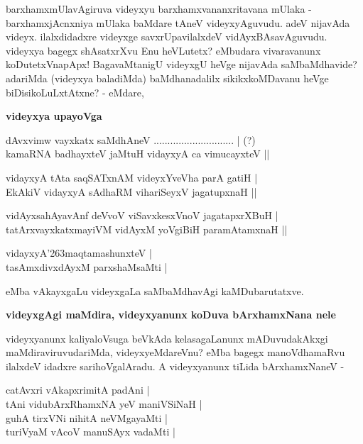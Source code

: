 \noindent
barxhamxmUlavAgiruva videyxyu barxhamxvananxritavana mUlaka - barxhamxjAcnxniya mUlaka baMdare tAneV videyx\-yAgu\-vudu. adeV nijavAda videyx. ilalxdidadxre videyxge savxrUpavilalxdeV vidAyxBAsavAguvudu. videyxya bagegx shAsatxrXvu Enu heVLutetx? eMbudara vivaravanunx koDutetxVnapApx! BagavaMtanigU videyxgU heVge nija\-vAda saMbaMdhavide? adariMda (videyxya baladiMda) baMdhanadalilx sikikxkoMDavanu heVge biDisi\-koLuLx\-tAtxne? - eMdare,

{\bigskip
\noindent
{\large\bf videyxya upayoVga}}

\begin{shloka}
dAvxvimw vayxkatx saMdhAneV ............................. | (?)\\\label{86}
kamaRNA badhayxteV jaMtuH vidayxyA ca vimucayxteV ||
\end{shloka}

\begin{shloka}
vidayxyA tAta saqSATxnAM videyxYveVha parA gatiH |\\\label{86}
EkAkiV vidayxyA sAdhaRM vihariSeyxV jagatupxnaH ||\\\label{86}

vidAyxsahAyavAnf deVvoV viSavxkesxVnoV jagatapxrXBuH |\\\label{86}
tatArxvayxkatxmayiVM vidAyxM yoVgiBiH paramAtamxnaH ||\\\label{86}

vidayxyA\char'263maqtamashunxteV |\\\label{86}
tasAmxdivxdAyxM parxshaMsaMti |\label{86}
\end{shloka}

\noindent
eMba vAkayxgaLu videyxgaLa saMbaMdhavAgi kaMDubarutatxve.

{\bigskip
\noindent
{\large\bf videyxgAgi maMdira, videyxyanunx koDuva bArxhamxNana nele}}
\medskip

\noindent
videyxyanunx kaliyaloVsuga beVkAda kelasagaLanunx mADuvudakAkxgi maMdiraviruvudariMda, videyx\-yeMdareVnu? eMba bagegx manoVdhamaRvu ilalxdeV idadxre sarihoVgalAradu. A videyxyanunx tiLida bArxhamxNaneV - 

\begin{shloka}
catAvxri vAkapxrimitA padAni |\\\label{86}
tAni vidubArxRhamxNA yeV maniVSiNaH |\\
guhA tirxVNi nihitA neVMgayaMti |\\
turiVyaM vAcoV manuSAyx vadaMti |
\end{shloka}


